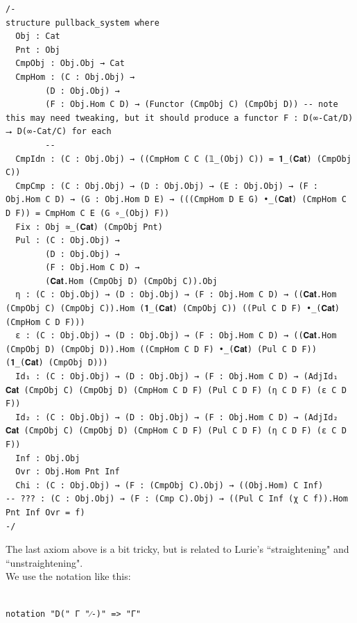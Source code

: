 \documentclass{book}
\theoremstyle{definition}
\newcounter{lcounter}
\begin{document}
{{\begin{center}
\begin{tcolorbox}[width=5in,colback={white},title={\begin{center}\texttt{Lean \thelcounter} \addtocounter{lcounter}{1}  \end{center}},colbacktitle=Blue,coltitle=black]
\begin{verbatim}
/-
structure pullback_system where
  Obj : Cat
  Pnt : Obj
  CmpObj : Obj.Obj → Cat
  CmpHom : (C : Obj.Obj) → 
        (D : Obj.Obj) → 
        (F : Obj.Hom C D) → (Functor (CmpObj C) (CmpObj D)) -- note this may need tweaking, but it should produce a functor F : D(∞-Cat/D) ⭢ D(∞-Cat/C) for each 
        -- 
  CmpIdn : (C : Obj.Obj) → ((CmpHom C C (𝟙_(Obj) C)) = 𝟏_(𝐂𝐚𝐭) (CmpObj C))
  CmpCmp : (C : Obj.Obj) → (D : Obj.Obj) → (E : Obj.Obj) → (F : Obj.Hom C D) → (G : Obj.Hom D E) → (((CmpHom D E G) •_(𝐂𝐚𝐭) (CmpHom C D F)) = CmpHom C E (G ∘_(Obj) F))
  Fix : Obj ≃_(𝐂𝐚𝐭) (CmpObj Pnt)
  Pul : (C : Obj.Obj) → 
        (D : Obj.Obj) → 
        (F : Obj.Hom C D) → 
        (𝐂𝐚𝐭.Hom (CmpObj D) (CmpObj C)).Obj
  η : (C : Obj.Obj) → (D : Obj.Obj) → (F : Obj.Hom C D) → ((𝐂𝐚𝐭.Hom (CmpObj C) (CmpObj C)).Hom (𝟏_(𝐂𝐚𝐭) (CmpObj C)) ((Pul C D F) •_(𝐂𝐚𝐭) (CmpHom C D F)))
  ε : (C : Obj.Obj) → (D : Obj.Obj) → (F : Obj.Hom C D) → ((𝐂𝐚𝐭.Hom (CmpObj D) (CmpObj D)).Hom ((CmpHom C D F) •_(𝐂𝐚𝐭) (Pul C D F)) (𝟏_(𝐂𝐚𝐭) (CmpObj D)))
  Id₁ : (C : Obj.Obj) → (D : Obj.Obj) → (F : Obj.Hom C D) → (AdjId₁ 𝐂𝐚𝐭 (CmpObj C) (CmpObj D) (CmpHom C D F) (Pul C D F) (η C D F) (ε C D F))
  Id₂ : (C : Obj.Obj) → (D : Obj.Obj) → (F : Obj.Hom C D) → (AdjId₂ 𝐂𝐚𝐭 (CmpObj C) (CmpObj D) (CmpHom C D F) (Pul C D F) (η C D F) (ε C D F))
  Inf : Obj.Obj
  Ovr : Obj.Hom Pnt Inf
  Chi : (C : Obj.Obj) → (F : (CmpObj C).Obj) → ((Obj.Hom) C Inf)
-- ??? : (C : Obj.Obj) → (F : (Cmp C).Obj) → ((Pul C Inf (χ C f)).Hom Pnt Inf Ovr = f)
-/

\end{verbatim}
\end{tcolorbox}
\end{center}

The last axiom above is a bit tricky, but is related to Lurie's ``straightening" and ``unstraightening".\\

We use the notation like this:

\begin{center}
\begin{tcolorbox}[width=5in,colback={white},title={\begin{center}\texttt{Lean \thelcounter} \addtocounter{lcounter}{1}  \end{center}},colbacktitle=Blue,coltitle=black]
\begin{verbatim}

notation "D(" Γ "⁄-)" => "Γ"

\end{verbatim}
\end{tcolorbox}
\end{center}

}}
\end{document}
